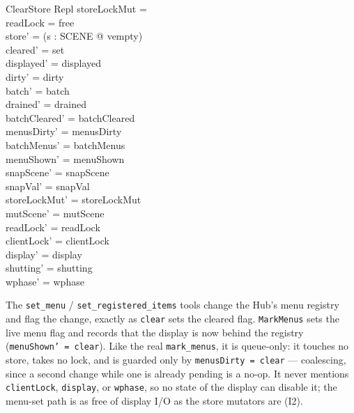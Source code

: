 \documentclass[a4paper,10pt,fleqn]{article}
\begin{document}
\begin{schema}{ClearStore}
  \Delta Repl
\where
  storeLockMut = \emptyset \\
  readLock = free \\
  store' = (\lambda s : SCENE @ vempty) \\
  cleared' = set \\
  displayed' = displayed \\
  dirty' = dirty \\
  batch' = batch \\
  drained' = drained \\
  batchCleared' = batchCleared \\
  menusDirty' = menusDirty \\
  batchMenus' = batchMenus \\
  menuShown' = menuShown \\
  snapScene' = snapScene \\
  snapVal' = snapVal \\
  storeLockMut' = storeLockMut \\
  mutScene' = mutScene \\
  readLock' = readLock \\
  clientLock' = clientLock \\
  display' = display \\
  shutting' = shutting \\
  wphase' = wphase
\end{schema}

The \texttt{set\_menu} / \texttt{set\_registered\_items} tools change the
Hub's menu registry and flag the change, exactly as \texttt{clear} sets the
cleared flag.  \texttt{MarkMenus} sets the live menu flag and records that the
display is now behind the registry (\texttt{menuShown' = clear}).  Like the
real \texttt{mark\_menus}, it is queue-only: it touches no store, takes no
lock, and is guarded only by \texttt{menusDirty = clear} --- coalescing, since
a second change while one is already pending is a no-op.  It never mentions
\texttt{clientLock}, \texttt{display}, or \texttt{wphase}, so no state of the
display can disable it; the menu-set path is as free of display I/O as the
store mutators are (I2).
\end{document}
